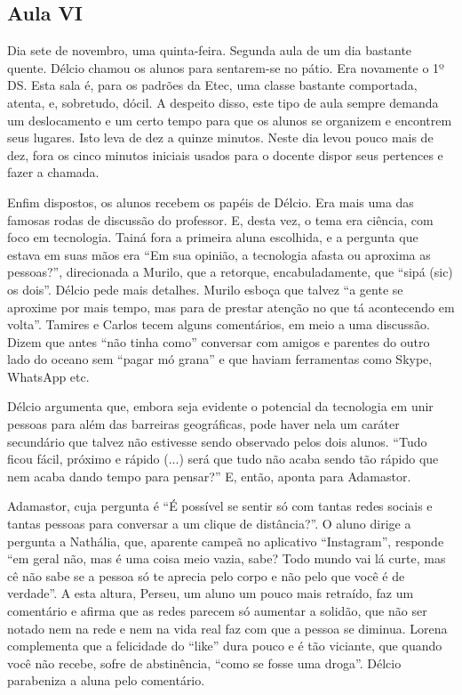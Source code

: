 \documentclass[12pt,a4paper]{article}
\begin{document}
	\subsection*{Aula VI}
	
	Dia sete de novembro, uma quinta-feira. Segunda aula de um dia bastante 
	quente. Délcio chamou os alunos para sentarem-se no pátio. Era novamente 
	o 1º DS. Esta sala é, para os padrões da Etec, uma classe bastante 
	comportada, atenta, e, sobretudo, dócil. 
	A despeito disso, este tipo de aula sempre demanda 
	um deslocamento e um certo tempo para que os alunos se organizem e 
	encontrem seus lugares. Isto leva de dez a quinze minutos. Neste dia 
	levou pouco mais de dez, fora os cinco minutos iniciais usados para 
	o docente dispor seus pertences e fazer a chamada. 
	
	Enfim dispostos, os alunos recebem os papéis de Délcio. Era mais uma 
	das famosas rodas de discussão do professor. E, desta vez, o tema era 
	ciência, com foco em tecnologia. Tainá fora a primeira aluna escolhida, 
	e a pergunta que estava em suas mãos era “Em sua opinião, a tecnologia 
	afasta ou aproxima as pessoas?”, direcionada a Murilo, que a retorque, 
	encabuladamente, que “sipá (sic) os dois”. Délcio pede mais detalhes. 
	Murilo esboça que talvez ``a gente se aproxime por mais tempo, mas 
	para de prestar atenção no que tá acontecendo em volta''. Tamires e 
	Carlos tecem alguns comentários, em meio a uma discussão. Dizem que 
	antes ``não tinha como'' conversar com amigos e parentes do outro 
	lado do oceano sem ``pagar mó grana'' e que haviam ferramentas como 
	Skype, WhatsApp etc. 
	
	Délcio argumenta que, embora seja evidente o potencial da tecnologia 
	em unir pessoas para além das barreiras geográficas, pode haver nela 
	um caráter secundário que talvez não estivesse sendo observado pelos 
	dois alunos. ``Tudo ficou fácil, próximo e rápido (...) será que tudo 
	não acaba sendo tão rápido que nem acaba dando tempo para pensar?''
	E, então, aponta para Adamastor. 
	
	Adamastor, cuja pergunta é ``É possível se sentir só com tantas redes 
	sociais e tantas pessoas para conversar a um clique de distância?''. 
	O aluno dirige a pergunta a Nathália, que, aparente campeã no aplicativo 
	``Instagram'', responde ``em geral não, mas é uma coisa meio vazia, 
	sabe? Todo mundo vai lá curte, mas cê não sabe se a pessoa só te 
	aprecia pelo corpo e não pelo que você é de verdade''. A esta altura, 
	Perseu, um aluno um pouco mais retraído, faz um comentário e afirma 
	que as redes parecem só aumentar a solidão, que não ser notado nem 
	na rede e nem na vida real faz com que a pessoa se diminua. Lorena 
	complementa que a felicidade do ``like'' dura pouco e é tão viciante, 
	que quando você não recebe, sofre de abstinência, ``como se fosse 
	uma droga''. Délcio parabeniza a aluna pelo comentário. 
	
\end{document}
